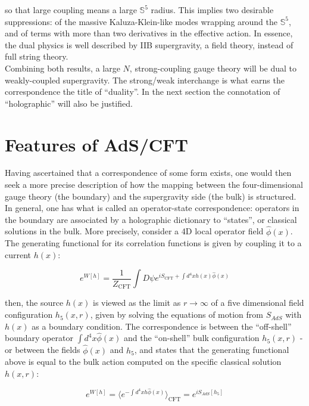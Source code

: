 so that large coupling means a large $\mathbb{S}^5$ radius. This implies two desirable suppressions: of the massive Kaluza-Klein-like modes wrapping around the $\mathbb{S}^5$, and of terms with more than two derivatives in the effective action. In essence, the dual physics is well described by IIB supergravity, a field theory, instead of full string theory.\\

Combining both results, a large $N$, strong-coupling gauge theory will be dual to weakly-coupled supergravity. The strong/weak interchange is what earns the correspondence the title of ``duality''. In the next section the connotation of ``holographic'' will also be justified.



\section{Features of AdS/CFT}

Having ascertained that a correspondence of some form exists, one would then seek a more precise description of how the mapping between the four-dimensional gauge theory (the boundary) and the supergravity side (the bulk) is structured. In general, one has what is called an operator-state correspondence: operators in the boundary are associated by a holographic dictionary to ``states'', or classical solutions in the bulk. More precisely, consider a 4D local operator field $\hat \phi(x)$. The generating functional for its correlation functions is given by coupling it to a current $h(x)$:

\begin{equation}
	e^{W[h]} = \frac{1}{Z_\text{CFT}}\int D\psi e^{i S_\text{CFT} + \int d^4 x h(x) \hat \phi(x)}
\end{equation}

then, the source $h(x)$ is viewed as the limit as $r \rightarrow \infty$ of a five dimensional field configuration $h_5(x,r)$, given by solving the equations of motion from $S_{AdS}$ with $h(x)$ as a boundary condition. The correspondence is between the ``off-shell'' boundary operator $\int d^4 x \hat \phi(x)$ and the ``on-shell'' bulk configuration $h_5(x,r)$ - or between the fields $\hat \phi(x)$ and $h_5$, and states that the generating functional above is equal to the bulk action computed on the specific classical solution $h(x,r)$:

\begin{equation}
	e^{W[h]} = \langle e^{-\int d^4 x h \hat \phi(x)} \rangle_\text{CFT} = e^{iS_{AdS}[h_5]}
	\label{}
\end{equation}

